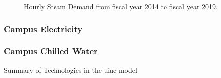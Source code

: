\begin{figure}[H]
  \centering
  \resizebox{0.8\columnwidth}{!}{}
  \caption{Hourly Steam Demand from fiscal year 2014 to fiscal year 2019.}
  \label{fig:historical-steam}
\end{figure}

\subsubsection{Campus Electricity}

\subsubsection{Campus Chilled Water}

\begin{table}[H]
  \centering
  \caption{Summary of Technologies in the \gls{uiuc} model}
  \label{tab:uiuc-tech}
  \resizebox{\textwidth}{!}{
  
  } %
\end{table}
